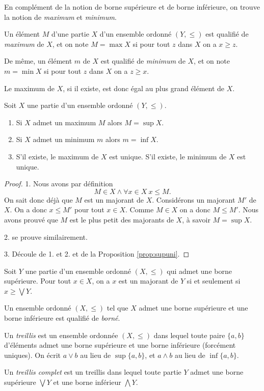 \documentclass[french,course,oneside,theoremnosection]{lecture}
\begin{document}
En complément de la notion de borne supérieure et de borne inférieure, on trouve la notion de \emph{maximum} et \emph{minimum}.

\begin{definition}
Un élément $M$ d'une partie $X$ d'un ensemble ordonné $(Y, \leq)$ est qualifié de \emph{maximum} de $X$, et on note $M=\max X$ si pour tout $z$ dans $X$ on a $x\geq z$.

De même, un élément $m$  de $X$ est qualifié de \emph{minimum} de $X$, et on note $m=\min X$ si pour tout $z$ dans $X$ on a $z\geq x$.
\end{definition}

Le maximum de $X$, si il existe, est donc égal au plus grand élément de $X$.

\begin{proposition}Soit $X$ une partie d'un ensemble ordonné $(Y, \leq)$.
\begin{enumerate}
\item Si $X$ admet un maximum $M$ alors $M=\sup X$.
\item Si $X$ admet un minimum $m$ alors $m=\inf X$. 
\item S'il existe, le maximum de $X$ est unique. S'il existe, le minimum de $X$ est unique.
\end{enumerate}
\end{proposition}
\begin{proof}
1. Nous avons par définition
\[
M\in X  \wedge \forall x \in X\ x \leq M.
\]
On sait donc déjà que $M$ est un majorant de $X$. Considérons un majorant $M'$ de $X$. On a donc $x\leq M'$ pour tout $x\in X$. Comme $M\in X$ on a donc $M\leq M'$. Nous avons prouvé que $M$ est le plus petit des majorants de $X$, à savoir $M=\sup X$.

2. se prouve similairement.

3. Découle de 1. et 2. et de la Proposition \ref{prop:supuni}.
\end{proof}

\begin{lemma}
Soit $Y$ une partie d'un ensemble ordonné $(X,\leq)$ qui admet une borne supérieure. Pour tout $x \in X$, on a
$x$ est un majorant de $Y$ si et seulement si $x\geq \bigvee Y$.
\end{lemma}
\begin{definition}
Un ensemble ordonné $(X,\leq)$ tel que $X$ admet une borne supérieure et une borne inférieure est qualifié de \emph{borné}. 

Un \emph{treillis} est un ensemble ordonnée $(X,\leq)$ dans lequel toute paire $\{a,b\}$ d'éléments admet une borne supérieure et une borne inférieure (forcément uniques). On écrit $a\vee b$ au lieu de $\sup\{a,b\}$, et $a \wedge b$ au lieu de $\inf\{a,b\}$.

Un \emph{treillis complet} est un treillis dans lequel toute partie $Y$ admet une borne supérieure ${\bigvee} Y$ et une borne inférieur ${\bigwedge} Y$.
 \end{definition}
 
\end{document}
